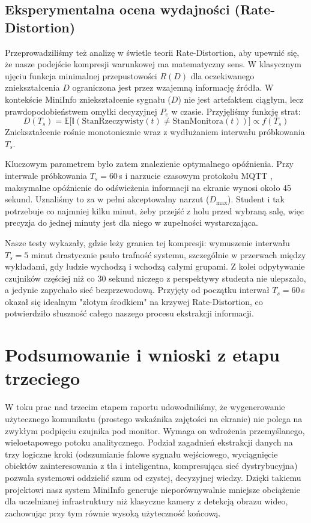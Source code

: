\documentclass[14pt,a4paper]{extarticle}
\begin{document}
\subsection{Eksperymentalna ocena wydajności (Rate-Distortion)}
Przeprowadziliśmy też analizę w świetle teorii Rate-Distortion, aby upewnić się, że nasze podejście kompresji warunkowej ma matematyczny sens. W klasycznym ujęciu funkcja minimalnej przepustowości $R(D)$ dla oczekiwanego zniekształcenia $D$ ograniczona jest przez wzajemną informację źródła. W kontekście MiniInfo zniekształcenie sygnału ($D$) nie jest artefaktem ciągłym, lecz prawdopodobieństwem omyłki decyzyjnej $P_e$ w czasie. Przyjęliśmy funkcję strat:
\begin{equation}
    D(T_s) = \mathbb{E}\big[ \mathbb{I}(\text{StanRzeczywisty}(t) \neq \text{StanMonitora}(t)) \big] \propto f(T_s)
\end{equation}
Zniekształcenie rośnie monotonicznie wraz z wydłużaniem interwału próbkowania $T_s$.

Kluczowym parametrem było zatem znalezienie optymalnego opóźnienia. Przy interwale próbkowania $T_s = 60$\,s i narzucie czasowym protokołu MQTT \cite{mqtt_spec}, maksymalne opóźnienie do odświeżenia informacji na ekranie wynosi około 45 sekund. Uznaliśmy to za w pełni akceptowalny narzut ($D_{\text{max}}$). Student i tak potrzebuje co najmniej kilku minut, żeby przejść z holu przed wybraną salę, więc precyzja do jednej minuty jest dla niego w zupełności wystarczająca.

Nasze testy wykazały, gdzie leży granica tej kompresji: wymuszenie interwału $T_s = 5$ minut drastycznie psuło trafność systemu, szczególnie w przerwach między wykładami, gdy ludzie wychodzą i wchodzą całymi grupami. Z kolei odpytywanie czujników częściej niż co 30 sekund niczego z perspektywy studenta nie ulepszało, a jedynie zapychało sieć bezprzewodową. Przyjęty od początku interwał $T_s = 60$\,s okazał się idealnym "złotym środkiem" na krzywej Rate-Distortion, co potwierdziło słuszność całego naszego procesu ekstrakcji informacji.

\section{Podsumowanie i wnioski z etapu trzeciego}
W toku prac nad trzecim etapem raportu udowodniliśmy, że wygenerowanie użytecznego komunikatu (prostego wskaźnika zajętości na ekranie) nie polega na zwykłym podpięciu czujnika pod monitor. Wymaga on wdrożenia przemyślanego, wieloetapowego potoku analitycznego. Podział zagadnień ekstrakcji danych na trzy logiczne kroki (odszumianie falowe sygnału wejściowego, wyciągnięcie obiektów zainteresowania z tła i inteligentna, kompresująca sieć dystrybucyjna) pozwala systemowi oddzielić szum od czystej, decyzyjnej wiedzy. Dzięki takiemu projektowi nasz system MiniInfo generuje nieporównywalnie mniejsze obciążenie dla uczelnianej infrastruktury niż klasyczne kamery z detekcją obrazu wideo, zachowując przy tym równie wysoką użyteczność końcową.
\end{document}
